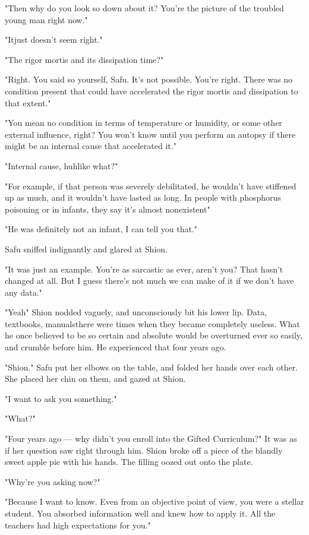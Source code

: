 "Then why do you look so down about it? You're the picture of the
troubled young man right now."

"It\el just doesn't seem right."

"The rigor mortis and its dissipation time?"

"Right. You said so yourself, Safu. It's not possible. You're right.
There was no condition present that could have accelerated the rigor
mortis and dissipation to that extent."

"You mean no condition in terms of temperature or humidity, or some
other external influence, right? You won't know until you perform an
autopsy if there might be an internal cause that accelerated it."

"Internal cause, huh\el like what?"

"For example, if that person was severely debilitated, he wouldn't have
stiffened up as much, and it wouldn't have lasted as long. In people
with phosphorus poisoning or in infants, they say it's almost
nonexistent\el "

"He was definitely not an infant, I can tell you that."

Safu sniffed indignantly and glared at Shion.

"It was just an example. You're as sarcastic as ever, aren't you? That
hasn't changed at all. But I guess there's not much we can make of it if
we don't have any data."

"Yeah\el " Shion nodded vaguely, and unconsciously bit his lower lip.
Data, textbooks, manuals\el there were times when they became completely
useless. What he once believed to be so certain and absolute would be
overturned ever so easily, and crumble before him. He experienced that
four years ago.

\mybreak

"Shion." Safu put her elbows on the table, and folded her hands over
each other. She placed her chin on them, and gazed at Shion.

"I want to ask you something."

"What?"

"Four years ago --- why didn't you enroll into the Gifted Curriculum?" It
was as if her question saw right through him. Shion broke off a piece of
the blandly sweet apple pie with his hands. The filling oozed out onto
the plate.

"Why're you asking now?"

"Because I want to know. Even from an objective point of view, you were
a stellar student. You absorbed information well and knew how to apply
it. All the teachers had high expectations for you."

